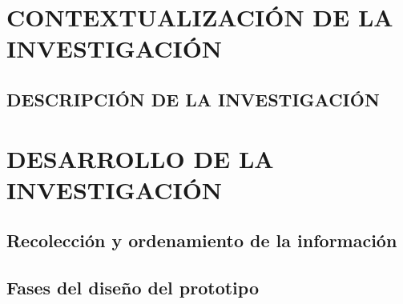 
%




\renewcommand{\tablename}{\textbf{Tabla}}
\renewcommand{\figurename}{\textbf{Figura}}
\renewcommand{\listtablename}{Lista de Tablas}
\renewcommand{\listfigurename}{Lista de Figuras}
\renewcommand{\contentsname}{Contenido}


\tableofcontents
\listoffigures
%

\part{CONTEXTUALIZACIÓN DE LA INVESTIGACIÓN}
\chapter{DESCRIPCIÓN DE LA INVESTIGACIÓN}
%







%
%

\part{DESARROLLO DE LA INVESTIGACIÓN}

\chapter{Recolección y ordenamiento de la información}


\chapter{Fases del diseño del prototipo}





